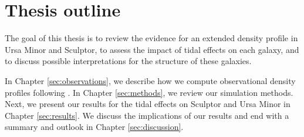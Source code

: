 \section{Thesis outline}\label{thesis-outline}

The goal of this thesis is to review the evidence for an extended
density profile in Ursa Minor and Sculptor, to assess the impact of
tidal effects on each galaxy, and to discuss possible interpretations
for the structure of these galaxies.

In Chapter \ref{sec:observations}, we describe how we compute
observational density profiles following \citet{jensen+2024}. In Chapter
\ref{sec:methods}, we review our simulation methods. Next, we present
our results for the tidal effects on Sculptor and Ursa Minor in Chapter
\ref{sec:results}. We discuss the implications of our results and end
with a summary and outlook in Chapter \ref{sec:discussion}.
